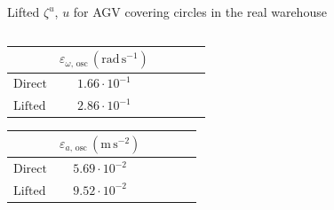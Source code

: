 \documentclass[10pt,aspectratio=1610]{beamer} %
\begin{document}
\begin{frame}{Lifted $\zeta^{u}$, $u$ for AGV covering circles in the real warehouse}
\begin{columns}[onlytextwidth]
\begin{column}{0.3\textwidth}
		\begin{table}[h!tbp]
			\small
			\begin{center}
				\begin{tabular}{lccccl}\toprule
					& $\varepsilon_{\omega,\,\mathrm{osc}}\,(\mathrm{rad\,s^{-1}})$\\
					\midrule
					$\mathrm{Direct}$& $1.66\cdot10^{-1}$\\
					$\mathrm{Lifted}$& $2.86\cdot10^{-1}$\\
					\bottomrule
				\end{tabular}
			\end{center}
		\end{table}
		\begin{table}[h!tbp]
			\small
			\begin{center}
				\begin{tabular}{lccccl}\toprule
					& $\varepsilon_{a,\,\mathrm{osc}}\,(\mathrm{m\,s^{-2}})$\\
					\midrule
					$\mathrm{Direct}$& $5.69\cdot10^{-2}$\\
					$\mathrm{Lifted}$& $9.52\cdot10^{-2}$\\
					\bottomrule
				\end{tabular}
			\end{center}
		\end{table}

	\end{column}
\end{columns}
\end{frame}
\end{document}
